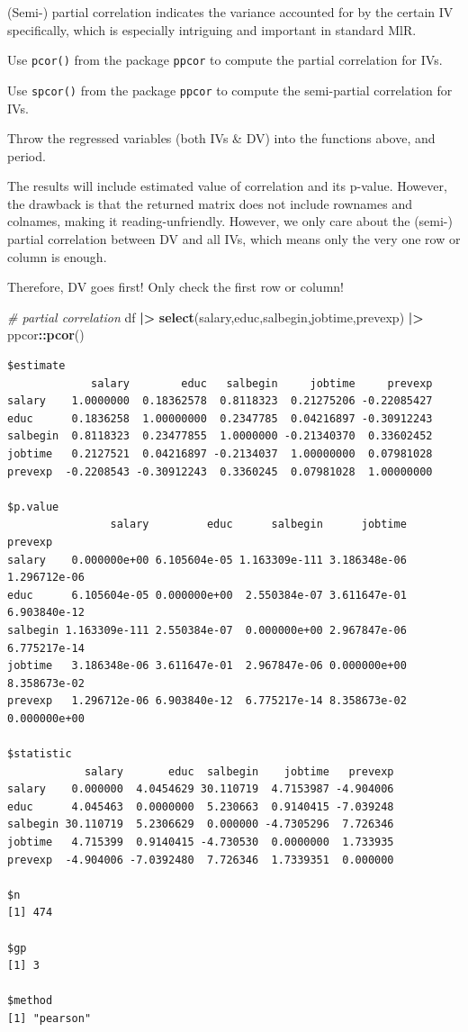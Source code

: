 \documentclass[
]{ctexart}
\newenvironment{Shaded}{\begin{snugshade}}{\end{snugshade}}
\newcommand{\CommentTok}[1]{\textcolor[rgb]{0.56,0.35,0.01}{\textit{#1}}}
\newcommand{\FunctionTok}[1]{\textcolor[rgb]{0.13,0.29,0.53}{\textbf{#1}}}
\newcommand{\NormalTok}[1]{#1}
\newcommand{\SpecialCharTok}[1]{\textcolor[rgb]{0.81,0.36,0.00}{\textbf{#1}}}
\begin{document}
(Semi-) partial correlation indicates the variance accounted for by the
certain IV specifically, which is especially intriguing and important in
standard MlR.

Use \texttt{pcor()} from the package \texttt{ppcor} to compute the
partial correlation for IVs.

Use \texttt{spcor()} from the package \texttt{ppcor} to compute the
semi-partial correlation for IVs.

Throw the regressed variables (both IVs \& DV) into the functions above,
and period.

The results will include estimated value of correlation and its p-value.
However, the drawback is that the returned matrix does not include
rownames and colnames, making it reading-unfriendly. However, we only
care about the (semi-) partial correlation between DV and all IVs, which
means only the very one row or column is enough.

Therefore, DV goes first! Only check the first row or column!

\begin{Shaded}
\begin{Highlighting}[]
\CommentTok{\# partial correlation}
\NormalTok{df }\SpecialCharTok{|\textgreater{}} \FunctionTok{select}\NormalTok{(salary,educ,salbegin,jobtime,prevexp) }\SpecialCharTok{|\textgreater{}} 
\NormalTok{  ppcor}\SpecialCharTok{::}\FunctionTok{pcor}\NormalTok{()}
\end{Highlighting}
\end{Shaded}

\begin{verbatim}
$estimate
             salary        educ   salbegin     jobtime     prevexp
salary    1.0000000  0.18362578  0.8118323  0.21275206 -0.22085427
educ      0.1836258  1.00000000  0.2347785  0.04216897 -0.30912243
salbegin  0.8118323  0.23477855  1.0000000 -0.21340370  0.33602452
jobtime   0.2127521  0.04216897 -0.2134037  1.00000000  0.07981028
prevexp  -0.2208543 -0.30912243  0.3360245  0.07981028  1.00000000

$p.value
                salary         educ      salbegin      jobtime      prevexp
salary    0.000000e+00 6.105604e-05 1.163309e-111 3.186348e-06 1.296712e-06
educ      6.105604e-05 0.000000e+00  2.550384e-07 3.611647e-01 6.903840e-12
salbegin 1.163309e-111 2.550384e-07  0.000000e+00 2.967847e-06 6.775217e-14
jobtime   3.186348e-06 3.611647e-01  2.967847e-06 0.000000e+00 8.358673e-02
prevexp   1.296712e-06 6.903840e-12  6.775217e-14 8.358673e-02 0.000000e+00

$statistic
            salary       educ  salbegin    jobtime   prevexp
salary    0.000000  4.0454629 30.110719  4.7153987 -4.904006
educ      4.045463  0.0000000  5.230663  0.9140415 -7.039248
salbegin 30.110719  5.2306629  0.000000 -4.7305296  7.726346
jobtime   4.715399  0.9140415 -4.730530  0.0000000  1.733935
prevexp  -4.904006 -7.0392480  7.726346  1.7339351  0.000000

$n
[1] 474

$gp
[1] 3

$method
[1] "pearson"
\end{verbatim}
\end{document}
